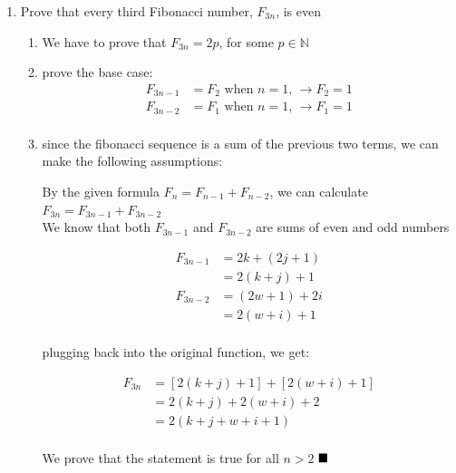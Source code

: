 \documentclass{article}
\begin{document}
\begin{itemize}
\begin{enumerate}[label=(d)]
            \item Prove that every third Fibonacci number, $F_{3n}$, is even
            \begin{enumerate}[label=(\roman*)]
                \item We have to prove that $F_{3n} = 2p$, for some $p \in \mathbb{N}$
                \item prove the base case:
                \begin{align*}
                    F_{3n-1} &= F_2 \text{ when $n=1$, } \rightarrow F_2 = 1\\
                    F_{3n-2} &= F_1 \text{ when $n=1$, } \rightarrow F_1 = 1\\
                \end{align*}
                \item since the fibonacci sequence is a sum of the previous two terms, we can make the following assumptions:
                \begin{center}
                    By the given formula $F_n = F_{n-1} + F_{n-2}$, we can calculate $F_{3n} = F_{3n-1} + F_{3n-2}$\\
                    We know that both $F_{3n-1}$ and $F_{3n-2}$ are sums of even and odd numbers
                \end{center}
                \begin{align*}
                    F_{3n-1} &= 2k + (2j + 1)\\
                             &= 2(k + j) + 1\\
                    F_{3n-2} &= (2w + 1) + 2i\\
                             &= 2(w + i) + 1\\
                \end{align*}
                \begin{center}
                    plugging back into the original function, we get:
                \end{center}
                \begin{align*}
                    F_{3n} &= [2(k+j) + 1] + [2(w+i) + 1]\\
                           &= 2(k + j) + 2(w+i) + 2\\
                           &= 2(k + j + w + i + 1)\\
                \end{align*}
                \begin{center}
                    We prove that the statement is true for all $n > 2$ $\hfill\blacksquare$

\end{center}
\end{enumerate}
\end{enumerate}
\end{itemize}
\end{document}
